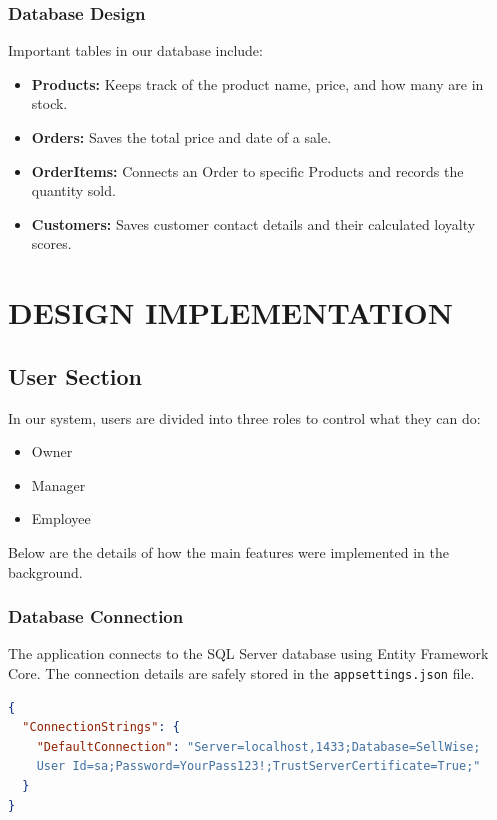 \documentclass[12pt,a4paper]{report}
\begin{document}
\subsection{Database Design}
Important tables in our database include:
\begin{itemize}
    \setlength{\itemsep}{0pt}
    \setlength{\parskip}{0pt}
    \setlength{\topsep}{4pt}
    \item \textbf{Products:} Keeps track of the product name, price, and how many are in stock.
    \item \textbf{Orders:} Saves the total price and date of a sale.
    \item \textbf{OrderItems:} Connects an Order to specific Products and records the quantity sold.
    \item \textbf{Customers:} Saves customer contact details and their calculated loyalty scores.
\end{itemize}


\chapter{DESIGN IMPLEMENTATION}

\section{User Section}
In our system, users are divided into three roles to control what they can do:
\begin{itemize}
    \item Owner
    \item Manager
    \item Employee
\end{itemize}

Below are the details of how the main features were implemented in the background.

\noindent\begin{minipage}{\textwidth}
\subsection{Database Connection}
The application connects to the SQL Server database using Entity Framework Core. The connection details are safely stored in the \texttt{appsettings.json} file.
\begin{lstlisting}[language=json]
{
  "ConnectionStrings": {
    "DefaultConnection": "Server=localhost,1433;Database=SellWise;
    User Id=sa;Password=YourPass123!;TrustServerCertificate=True;"
  }
}
\end{lstlisting}
\end{minipage}
\vspace{1em}
\end{document}
